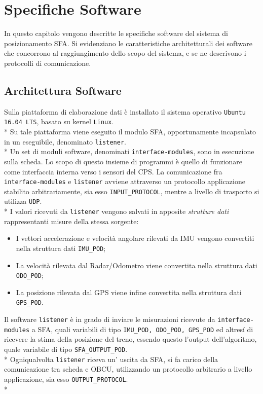 \chapter{Specifiche Software}
In questo capitolo vengono descritte le specifiche software del sistema di posizionamento SFA. Si evidenziano le caratteristiche architetturali dei software che concorrono al raggiungimento dello scopo del sistema, e se ne descrivono i protocolli di comunicazione.
\section{Architettura Software}
Sulla piattaforma di elaborazione dati \`e installato il sistema operativo \texttt{Ubuntu 16.04 LTS}, basato su kernel \texttt{Linux}.
\\*
Su tale piattaforma viene eseguito il modulo SFA, opportunamente incapsulato in un eseguibile, denominato \texttt{listener}.\\*
Un set di moduli software, denominati \texttt{interface-modules}, sono in esecuzione sulla scheda. Lo scopo di questo insieme di programmi \`e quello di funzionare come interfaccia interna verso i sensori del CPS. 
La comunicazione fra \texttt{interface-modules} e \texttt{listener} avviene attraverso un protocollo applicazione stabilito arbitrariamente, sia esso \texttt{INPUT\_PROTOCOL}, mentre a livello di trasporto si utilizza \texttt{UDP}.\\*
I valori ricevuti da \texttt{listener} vengono salvati in apposite \emph{strutture dati} rappresentanti misure della stessa sorgente:
\begin{itemize}
\item I vettori accelerazione e velocit\`a angolare rilevati da IMU vengono convertiti nella struttura dati \texttt{IMU\_POD};
\item La velocit\`a rilevata dal Radar/Odometro viene convertita nella struttura dati \texttt{ODO\_POD};
\item La posizione rilevata dal GPS viene infine convertita nella struttura dati \texttt{GPS\_POD}.
\end{itemize}
Il software \texttt{listener} \`e in grado di inviare le misurazioni ricevute da \texttt{interface-modules} a SFA, quali variabili di tipo \texttt{IMU\_POD, ODO\_POD, GPS\_POD} ed altres\'i di ricevere la stima della posizione del treno, essendo questo l'output dell'algoritmo, quale variabile di tipo \texttt{SFA\_OUTPUT\_POD}.\\*
Ogniqualvolta \texttt{listener} riceva un' uscita da SFA, si fa carico della comunicazione tra scheda e OBCU, utilizzando un protocollo arbitrario a livello applicazione, sia esso \texttt{OUTPUT\_PROTOCOL}.\\*

